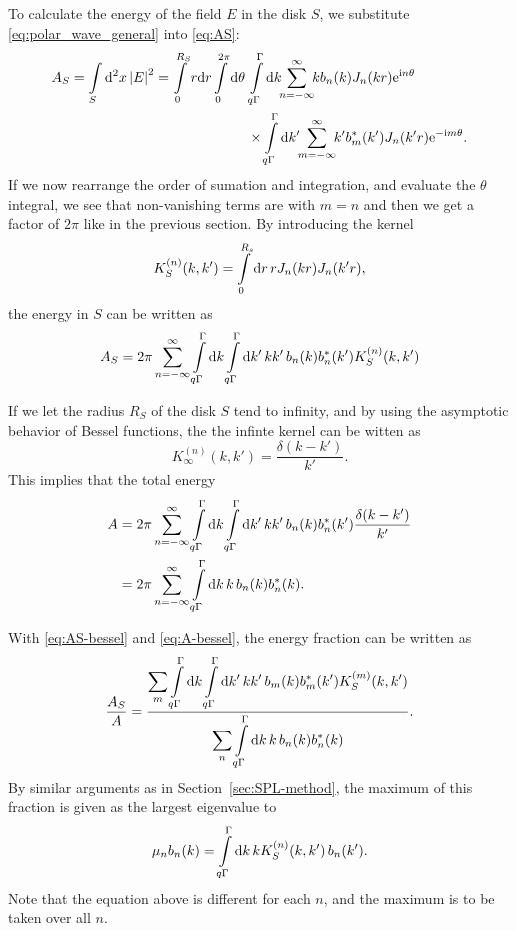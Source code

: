 \documentclass[11pt,a4paper, 
swedish,english %
]{article}
\begin{document}
To calculate the energy of the field $E$ in the disk $S$, we
substitute \eqref{eq:polar_wave_general} into \eqref{eq:AS}: 
\begin{equation}
\begin{aligned}
A_S= \int_S \rd^2x\, \abs{E}^2 = 
\int_0^{R_S} r\rd{r} \int_0^{2\pi} \rd\theta \,&
\int_{q\Gamma}^\Gamma \rd{k}\!\!
\sum_{n= -\infty}^{\infty}\!\! kb_n(k) J_n(kr)\ee^{\ii n \theta}\\
&\times
\int_{q\Gamma}^\Gamma \rd{k'}\!\!
\sum_{m= -\infty}^{\infty}\!\! k'b_m^*(k') J_n(k'r)\ee^{-\ii m
  \theta}.
\end{aligned}
\end{equation}
If we now rearrange the order of sumation and integration, and
evaluate the $\theta$ integral, we see that non-vanishing terms are
with $m=n$ and then we get a factor of $2\pi$ like in the previous
section. By introducing the kernel 
\begin{equation}\label{eq:KS-bessel}
K_S^{(n)}(k, k') = \int_{0}^{R_s} \rd{r}\, r J_n(kr) J_n(k'r),
\end{equation}
the energy in $S$ can be written as
\begin{equation}\label{eq:AS-bessel}
A_S =2\pi \sum_{n=-\infty}^{\infty} 
\int_{q\Gamma}^\Gamma \rd{k} \int_{q\Gamma}^\Gamma \rd{k'}\,  
kk'\, b_n(k)b_n^*(k') K_S^{(n)}(k, k')
\end{equation}

If we let the radius $R_S$ of the disk $S$ tend to infinity, and by
using the asymptotic behavior of Bessel functions, the the infinte
kernel can be witten as
\begin{equation}
K_\infty^{(n)}(k,k') = \frac{\delta(k-k')}{k'}.
\end{equation}
This implies that the total energy
\begin{equation}\label{eq:A-bessel}
\begin{aligned}
A &=2\pi \sum_{n=-\infty}^{\infty} 
\int_{q\Gamma}^\Gamma \rd{k} \int_{q\Gamma}^\Gamma \rd{k'}\,  
kk'\, b_n(k)b_n^*(k') \frac{\delta(k-k')}{k'} \\
&=2\pi \sum_{n=-\infty}^{\infty} 
\int_{q\Gamma}^\Gamma \rd{k} \, k\, b_n(k)b_n^*(k).
\end{aligned}
\end{equation}

With \eqref{eq:AS-bessel} and \eqref{eq:A-bessel}, the energy fraction
can be written as
\begin{equation}\label{eq:E-frac-bessel}
\frac{A_S}{A}
=\frac{\displaystyle{\sum_{m}} \int_{q\Gamma}^\Gamma \rd{k} \int_{q\Gamma}^\Gamma \rd{k'}\,  
kk'\, b_m(k)b_m^*(k') K_S^{(m)}(k, k')}
{\displaystyle{\sum_{n}} \int_{q\Gamma}^\Gamma \rd{k} \, k\, b_n(k)b_n^*(k)}.
\end{equation}
By similar arguments as in Section~\ref{sec:SPL-method}, the maximum
of this fraction is given as the largest eigenvalue to
\begin{equation}
\mu_nb_n(k) = \int_{q\Gamma}^{\Gamma}\rd{k}\,k K_S^{(n)}(k, k')\,b_n(k').
\end{equation}
Note that the equation above is different for each $n$, and the
maximum is to be taken over all $n$.
\end{document}
